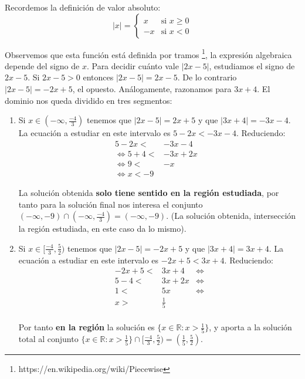 \documentclass[10pt,a4paper]{article}
\begin{document}
\noindent
Recordemos la definición de valor absoluto:
\begin{equation*}
  \vert x \vert =
  \begin{cases}
    x & \mbox{si } x\geq 0 \\
   -x & \mbox{si } x < 0
  \end{cases}
\end{equation*}

\noindent
Observemos que esta función está definida por tramos
\footnote{https://en.wikipedia.org/wiki/Piecewise},
la expresión algebraica depende del signo de $x$.
Para decidir cuánto vale $|2x - 5|$, estudiamos el signo de $2x-5$.
Si $2x-5>0$ entonces $|2x-5| = 2x-5$. De lo contrario $|2x-5| = -2x+5$,
el opuesto. Análogamente, razonamos para $ 3x+4$.
El dominio nos queda dividido en tres segmentos:
\begin{enumerate}
\item
  Si $x \in (-\infty, \frac{-4}{3})$ tenemos que $|2x-5| = 2x+5$ y que
  $|3x+4| = -3x-4$.
  La ecuación a estudiar en este intervalo es $ 5-2x < -3x-4$.
  Reduciendo:
  \begin{align*}
    5-2x  <& -3x-4&\\
    \iff 5 + 4 <& -3x + 2x& \\
    \iff 9 <& -x & \\
    \iff x < -9
  \end{align*}

  La solución obtenida {\bf solo tiene sentido en la región estudiada},
  por tanto para la solución final nos interesa el conjunto
  $(-\infty, -9) \cap (-\infty, \frac{-4}{3}) = (-\infty, -9)$.
  (La solución obtenida, intersección la región estudiada, en este caso da
  lo mismo).
  
\item
  Si $x \in [\frac{-4}{3}, \frac{5}{2})$ tenemos que $|2x-5| = -2x+5$ y que
  $|3x+4| = 3x+4$.
  La ecuación a estudiar en este intervalo es $ -2x+5 < 3x+4$.
  Reduciendo:
  \begin{align*}
    -2x+5  <& 3x+4     & \iff \\
     5 - 4 <& 3x + 2 x & \iff \\
     1     <& 5x       & \iff \\
     x     >& \frac{1}{5} &\\
  \end{align*}

  Por tanto {\bf en la región} la solución es
  $\{ x\in \mathbb{R} : x > \frac{1}{5}\}$, y aporta a la solución total
  al conjunto
  $\{ x\in \mathbb{R} : x > \frac{1}{5}\} \cap [\frac{-4}{3}, \frac{5}{2})
  = (\frac{1}{5}, \frac{5}{2})$.


\end{enumerate}
\end{document}
